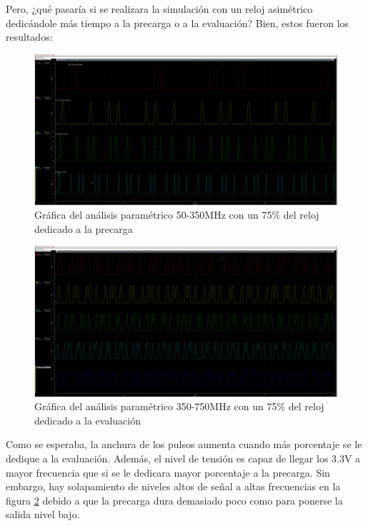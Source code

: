 \newpage Pero, ¿qué pasaría si se realizara la simulación con un reloj asimétrico dedicándole más tiempo a la precarga o a la evaluación? Bien, estos fueron los resultados:
\begin{figure}[H]%
\hspace{-10mm}
\includegraphics[width=1.2\textwidth]{figures/AsimMuchPreload.png}
\caption{Gráfica del análisis paramétrico 50-350MHz con un 75\% del reloj dedicado a la precarga}
\label{fig:FreqAsimPreload}
\end{figure}
\vspace{-8mm}
\begin{figure}[H]%
\hspace{-10mm}
\includegraphics[width=1.2\textwidth]{figures/AsimMuchEval.png}
\caption{Gráfica del análisis paramétrico 350-750MHz con un 75\% del reloj dedicado a la evaluación}
\label{fig:FreqAsimEval}
\end{figure} 
Como se esperaba, la anchura de los pulsos aumenta cuando más porcentaje se le dedique a la evaluación. Además, el nivel de tensión es capaz de llegar los 3.3V a mayor frecuencia que si se le dedicara mayor porcentaje a la precarga. Sin embargo, hay solapamiento de niveles altos de señal a altas frecuencias en la figura \ref{fig:FreqAsimEval} debido a que la precarga dura demasiado poco como para ponerse la salida nivel bajo.

